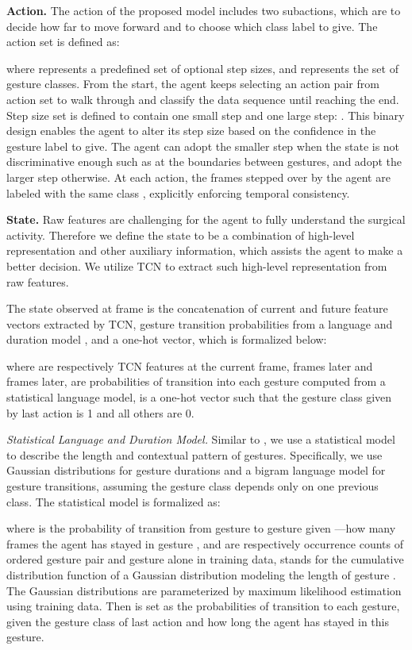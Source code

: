 \documentclass{llncs}
\begin{document}
\textbf{Action.} The action of the proposed model includes two subactions, which are to decide how far to move forward and to choose which class label to give. The action set is defined as:

where  represents a predefined set of optional step sizes, and  represents the set of gesture classes. From the start, the agent keeps selecting an action pair  from action set  to walk through and classify the data sequence until reaching the end. Step size set  is defined to contain one small step and one large step: . This binary design enables the agent to alter its step size based on the confidence in the gesture label to give. The agent can adopt the smaller step when the state is not discriminative enough such as at the boundaries between gestures, and adopt the larger step otherwise. At each action, the  frames stepped over by the agent are labeled with the same class , explicitly enforcing temporal consistency.

\textbf{State.} Raw features  are challenging for the agent to fully understand the surgical activity. Therefore we define the state to be a combination of high-level representation and other auxiliary information, which assists the agent to make a better decision. We utilize TCN \cite{Lea_2017_CVPR,lea2016temporal} to extract such high-level representation from raw features.

The state observed at frame  is the concatenation of current and future feature vectors extracted by TCN, gesture transition probabilities from a language and duration model \cite{richard2016temporal}, and a one-hot vector, which is formalized below:

where  are respectively TCN features at the current frame,  frames later and  frames later,  are probabilities of transition into each gesture computed from a statistical language model,  is a one-hot vector such that the gesture class given by last action is 1 and all others are 0.

{\itshape Statistical Language and Duration Model.} Similar to \cite{richard2016temporal}, we use a statistical model to describe the length and contextual pattern of gestures. Specifically, we use Gaussian distributions for gesture durations and a bigram language model for gesture transitions, assuming the gesture class depends only on one previous class. The statistical model is formalized as:

where  is the probability of transition from gesture  to gesture  given ---how many frames the agent has stayed in gesture ,  and  are respectively occurrence counts of ordered gesture pair  and gesture  alone in training data,  stands for the cumulative distribution function of a Gaussian distribution modeling the length of gesture . The Gaussian distributions are parameterized by maximum likelihood estimation using training data. Then  is set as the probabilities of transition to each gesture, given the gesture class of last action and how long the agent has stayed in this gesture.
\end{document}

